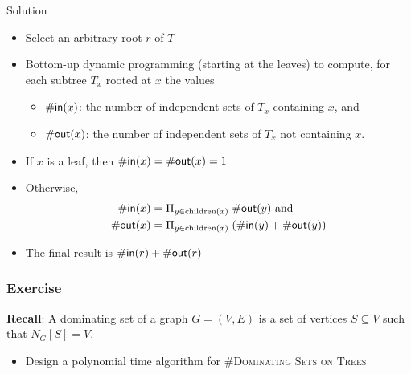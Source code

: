\begin{frame}{Solution}
	\begin{itemize}
		\item Select an arbitrary root $r$ of $T$
		\item Bottom-up dynamic programming (starting at the leaves) to compute, for each subtree $T_x$ rooted at $x$ the values
		\begin{itemize}
			\item $\mathsf{\#in}(x)$: the number of independent sets of $T_x$ containing $x$, and
			\item $\mathsf{\#out}(x)$: the number of independent sets of $T_x$ not containing $x$.
		\end{itemize}
		\item If $x$ is a leaf, then $\mathsf{\#in}(x)=\mathsf{\#out}(x)=1$
		\item Otherwise,
		\begin{align*}
		 \mathsf{\#in}(x) &= \Pi_{y \in \text{children} (x)} \;\mathsf{\#out}(y) \text{ and}\\
		 \mathsf{\#out}(x) &= \Pi_{y \in \text{children} (x)} \;(\mathsf{\#in}(y)+\mathsf{\#out}(y))
		\end{align*}
		\item The final result is $\mathsf{\#in}(r)+\mathsf{\#out}(r)$
	\end{itemize}
\end{frame}


\begin{frame}
 \frametitle{Exercise}
 
  \noindent
 	\textbf{Recall}: A \alert{dominating set} of a graph $G=(V,E)$ is a set of vertices $S\subseteq V$ such that $N_G[S]=V$.
 	
        
        \begin{itemize}
         \item Design a polynomial time algorithm for \#\textsc{Dominating Sets on Trees}
        \end{itemize}

\end{frame}


